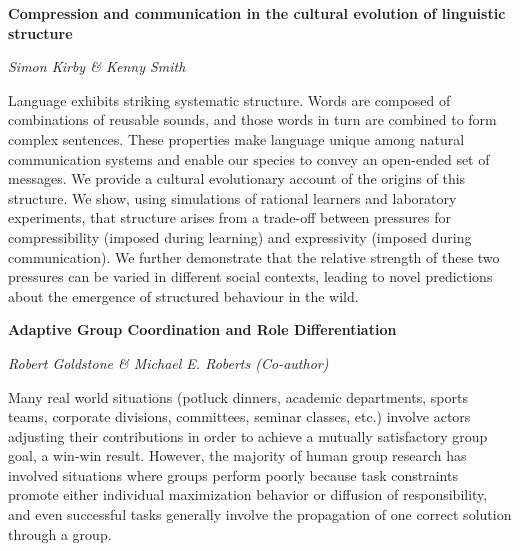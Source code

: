 \documentclass[10pt,letterpaper]{article}
\begin{document}


\begin{center}\textbf{Compression and communication in the cultural evolution of linguistic structure}\end{center}
\begin{center}\emph{Simon Kirby \& Kenny Smith}\end{center}

Language exhibits striking systematic structure. Words are composed of combinations of reusable sounds, and those words in turn are combined to form complex sentences. These properties make language unique among natural communication systems and enable our species to convey an open-ended set of messages. We provide a cultural evolutionary account of the origins of this structure. We show, using simulations of rational learners and laboratory experiments, that structure arises from a trade-off between pressures for compressibility (imposed during learning) and expressivity (imposed during communication). We further demonstrate that the relative strength of these two pressures can be varied in different social contexts, leading to novel predictions about the emergence of structured behaviour in the wild.

\begin{center}\textbf{Adaptive Group Coordination and Role Differentiation}\end{center}
\begin{center}\emph{Robert Goldstone \& Michael E. Roberts (Co-author)}\end{center}

Many real world situations (potluck dinners, academic departments, sports teams, corporate divisions, committees, seminar classes, etc.) involve actors adjusting their contributions in order to achieve a mutually satisfactory group goal, a win-win result.  However, the majority of human group research has involved situations where groups perform poorly because task constraints promote either individual maximization behavior or diffusion of responsibility, and even successful tasks generally involve the propagation of one correct solution through a group.  
\end{document}
